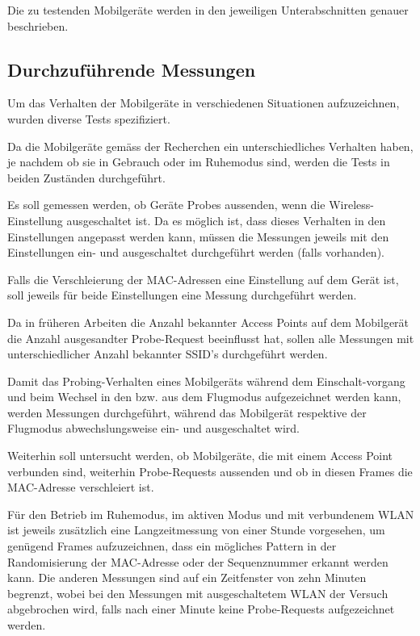 Die zu testenden Mobilgeräte werden in den jeweiligen 
Unterabschnitten genauer beschrieben.

\clearpage

\subsection{Durchzuführende Messungen
\label{subsection:plannedexperiments}}
Um das Verhalten der Mobilgeräte in verschiedenen Situationen aufzuzeichnen,
wurden diverse Tests spezifiziert.

Da die Mobilgeräte gemäss der Recherchen ein unterschiedliches Verhalten haben,
je nachdem ob sie in Gebrauch oder im Ruhemodus sind, werden die Tests in beiden
Zuständen durchgeführt.

Es soll gemessen werden, ob Geräte Probes aussenden, wenn die Wireless-
Einstellung ausgeschaltet ist. 
Da es möglich ist, dass dieses Verhalten in den Einstellungen angepasst werden
kann, müssen die Messungen jeweils mit den Einstellungen ein- und ausgeschaltet
durchgeführt werden (falls vorhanden).

Falls die Verschleierung der MAC-Adressen eine Einstellung auf dem Gerät ist,
soll jeweils für beide Einstellungen eine Messung durchgeführt werden.

Da in früheren Arbeiten die Anzahl bekannter Access Points auf dem Mobilgerät
die Anzahl ausgesandter Probe-Request beeinflusst hat, sollen alle Messungen
mit unterschiedlicher Anzahl bekannter SSID's durchgeführt werden.

Damit das Probing-Verhalten eines Mobilgeräts während dem Einschalt-vorgang und
beim Wechsel in den bzw. aus dem Flugmodus aufgezeichnet werden kann, 
werden Messungen durchgeführt, während das Mobilgerät respektive der 
Flugmodus abwechslungsweise ein- und ausgeschaltet wird.

Weiterhin soll untersucht werden, ob Mobilgeräte, die mit einem Access Point
verbunden sind, weiterhin Probe-Requests aussenden und ob in diesen Frames 
die MAC-Adresse verschleiert ist.

Für den Betrieb im Ruhemodus, im aktiven Modus und mit verbundenem WLAN 
ist jeweils zusätzlich eine Langzeitmessung von einer Stunde vorgesehen, 
um genügend Frames aufzuzeichnen, dass ein mögliches Pattern in der 
Randomisierung der MAC-Adresse oder der Sequenznummer erkannt werden kann.
Die anderen Messungen sind auf ein Zeitfenster von zehn Minuten begrenzt, wobei
bei den Messungen mit ausgeschaltetem WLAN der Versuch abgebrochen wird, falls 
nach einer Minute keine Probe-Requests aufgezeichnet werden.

